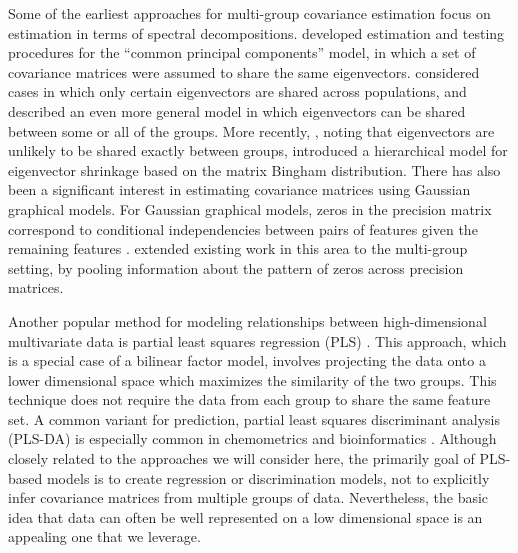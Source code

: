 \documentclass[12pt]{article}
\begin{document}

Some of the earliest approaches for multi-group covariance estimation
focus on estimation in terms of spectral decompositions.
\cite{Flury1987} developed estimation and testing procedures for the
``common principal components'' model, in which a set of covariance
matrices were assumed to share the same eigenvectors.
\citet{Schott1991, Schott1999} considered cases in which only certain
eigenvectors are shared across populations, and \citet{Boik2002}
described an even more general model in which eigenvectors can be
shared between some or all of the groups.  More recently,
\citet{Hoff2009}, noting that eigenvectors are unlikely to be shared
exactly between groups, introduced a hierarchical model for
eigenvector shrinkage based on the matrix Bingham distribution.  There
has also been a significant interest in estimating covariance matrices
using Gaussian graphical models. For Gaussian graphical models, zeros
in the precision matrix correspond to conditional independencies
between pairs of features given the remaining features
\citep{Meinshausen2006}.  \citet{Witten2014} extended existing work in
this area to the multi-group setting, by pooling information about the
pattern of zeros across precision matrices.


Another popular method for modeling relationships between
high-dimensional multivariate data is partial least squares regression
(PLS) \citep{Wold2001}. This approach, which is a special case of a bilinear factor
model, involves projecting the data onto a lower dimensional space which
maximizes the similarity of the two groups.  This technique does not
require the data from each group to share the same feature set.  A
common variant for prediction, partial least squares discriminant
analysis (PLS-DA) is especially common in chemometrics and
bioinformatics \citep{Barker2003}.  Although closely related to the
approaches we will consider here, the primarily goal of PLS-based
models is to create regression or discrimination models, not to
explicitly infer covariance matrices from multiple groups of data.
Nevertheless, the basic idea that data can often be well represented
on a low dimensional space is an appealing one that we leverage.
\end{document}
